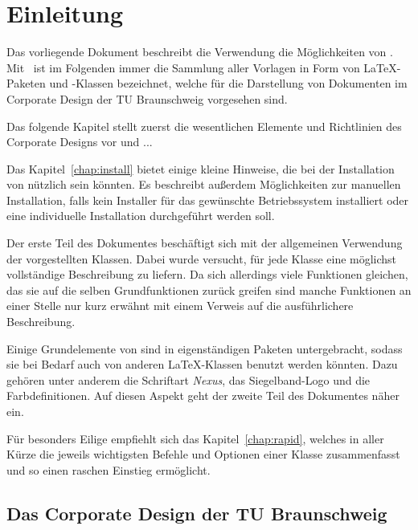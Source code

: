 \chapter{Einleitung}

Das vorliegende Dokument beschreibt die Verwendung die Möglichkeiten von \tubslatex.
Mit \tubslatex\ ist im Folgenden immer die Sammlung aller Vorlagen in Form
von \LaTeX-Paketen und -Klassen bezeichnet, welche für die Darstellung von
Dokumenten im Corporate Design der TU Braunschweig vorgesehen sind.

Das folgende Kapitel stellt zuerst die wesentlichen Elemente und Richtlinien
des Corporate Designs vor und ... %

Das Kapitel~\ref{chap:install} bietet einige kleine Hinweise, die bei
der Installation von \tubslatex nützlich sein könnten.
Es beschreibt außerdem Möglichkeiten zur manuellen Installation, falls
kein Installer für das gewünschte Betriebssystem installiert oder eine
individuelle Installation durchgeführt werden soll.

Der erste Teil des Dokumentes beschäftigt sich mit der allgemeinen Verwendung
der vorgestellten Klassen.
Dabei wurde versucht, für jede Klasse eine möglichst vollständige Beschreibung
zu liefern. Da sich allerdings viele Funktionen gleichen, das sie auf die selben
Grundfunktionen zurück greifen sind manche Funktionen an einer Stelle nur kurz
erwähnt mit einem Verweis auf die ausführlichere Beschreibung.

Einige Grundelemente von \tubslatex sind in eigenständigen Paketen untergebracht,
sodass sie bei Bedarf auch von anderen \LaTeX-Klassen benutzt werden könnten.
Dazu gehören unter anderem die Schriftart \emph{Nexus}, das Siegelband-Logo
und die Farbdefinitionen.
Auf diesen Aspekt geht der zweite Teil des Dokumentes näher ein.%

Für besonders Eilige empfiehlt sich das Kapitel~\ref{chap:rapid},
welches in aller Kürze die jeweils wichtigsten Befehle und Optionen einer Klasse
zusammenfasst und so einen raschen Einstieg ermöglicht.

\clearpage
\section{Das Corporate Design der TU Braunschweig}

